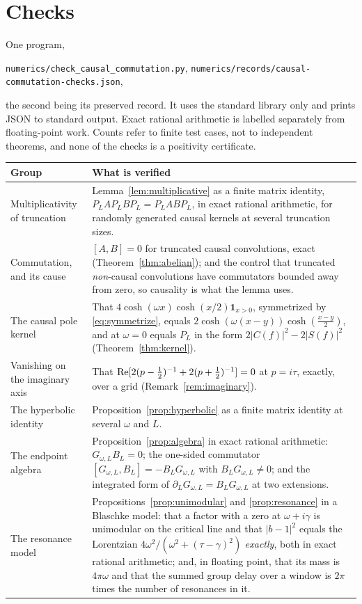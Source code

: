 \section{Checks}\label{app:checks}

One program,
\begin{center}
\texttt{numerics/check\_causal\_commutation.py},\qquad
\texttt{numerics/records/causal-commutation-checks.json},
\end{center}
the second being its preserved record. It uses the standard library only and
prints JSON to standard output. Exact rational arithmetic is labelled separately
from floating-point work. Counts refer to finite test cases, not to independent
theorems, and none of the checks is a positivity certificate.

\begin{center}
\begin{tabular}{@{}p{}p{}@{}}
\toprule
Group & What is verified\\
\midrule
Multiplicativity of truncation &
Lemma~\ref{lem:multiplicative} as a finite matrix identity,
$P_LAP_LBP_L=P_LABP_L$, in exact rational arithmetic, for randomly generated
causal kernels at several truncation sizes.\\
Commutation, and its cause &
$[A,B]=0$ for truncated causal convolutions, exact
(Theorem~\ref{thm:abelian}); and the control that truncated \emph{non}-causal
convolutions have commutators bounded away from zero, so causality is what the
lemma uses.\\
The causal pole kernel &
That $4\cosh(\omega x)\cosh(x/2)\mathbf1_{x>0}$, symmetrized by
\eqref{eq:symmetrize}, equals $2\cosh(\omega(x-y))\cosh(\frac{x-y}2)$, and at
$\omega=0$ equals $P_L$ in the form $2|C(f)|^2-2|S(f)|^2$
(Theorem~\ref{thm:kernel}).\\
Vanishing on the imaginary axis &
That $\operatorname{Re}[2(p-\frac12)^{-1}+2(p+\frac12)^{-1}]=0$ at $p=i\tau$, exactly, over a
grid (Remark~\ref{rem:imaginary}).\\
The hyperbolic identity &
Proposition~\ref{prop:hyperbolic} as a finite matrix identity at several
$\omega$ and $L$.\\
The endpoint algebra &
Proposition~\ref{prop:algebra} in exact rational arithmetic: $G_{\omega,L}B_L=0$;
the one-sided commutator $[G_{\omega,L},B_L]=-B_LG_{\omega,L}$ with
$B_LG_{\omega,L}\neq0$; and the integrated form of
$\partial_LG_{\omega,L}=B_LG_{\omega,L}$ at two extensions.\\
The resonance model &
Propositions~\ref{prop:unimodular} and \ref{prop:resonance} in a Blaschke model:
that a factor with a zero at $\omega+i\gamma$ is unimodular on the critical line
and that $|b-1|^2$ equals the Lorentzian $4\omega^2/(\omega^2+(\tau-\gamma)^2)$
\emph{exactly}, both in exact rational arithmetic; and, in floating point, that
its mass is $4\pi\omega$ and that the summed group delay over a window is $2\pi$
times the number of resonances in it.\\
\bottomrule
\end{tabular}
\end{center}


